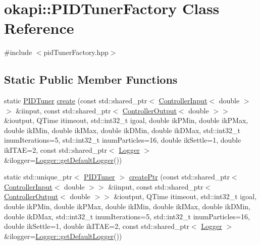 \hypertarget{classokapi_1_1PIDTunerFactory}{}\section{okapi\+::P\+I\+D\+Tuner\+Factory Class Reference}
\label{classokapi_1_1PIDTunerFactory}


{\ttfamily \#include $<$pid\+Tuner\+Factory.\+hpp$>$}

\subsection*{Static Public Member Functions}
\begin{DoxyCompactItemize}
\item 
static \mbox{\hyperlink{classokapi_1_1PIDTuner}{P\+I\+D\+Tuner}} \mbox{\hyperlink{classokapi_1_1PIDTunerFactory_afe5edc3050334e81b98a956c4a9392fe}{create}} (const std\+::shared\+\_\+ptr$<$ \mbox{\hyperlink{classokapi_1_1ControllerInput}{Controller\+Input}}$<$ double $>$$>$ \&iinput, const std\+::shared\+\_\+ptr$<$ \mbox{\hyperlink{classokapi_1_1ControllerOutput}{Controller\+Output}}$<$ double $>$$>$ \&ioutput, Q\+Time itimeout, std\+::int32\+\_\+t igoal, double ik\+P\+Min, double ik\+P\+Max, double ik\+I\+Min, double ik\+I\+Max, double ik\+D\+Min, double ik\+D\+Max, std\+::int32\+\_\+t inum\+Iterations=5, std\+::int32\+\_\+t inum\+Particles=16, double ik\+Settle=1, double ik\+I\+T\+AE=2, const std\+::shared\+\_\+ptr$<$ \mbox{\hyperlink{classokapi_1_1Logger}{Logger}} $>$ \&ilogger=\mbox{\hyperlink{classokapi_1_1Logger_a5053cf778b4b55acba788a3797dc96d2}{Logger\+::get\+Default\+Logger}}())
\item 
static std\+::unique\+\_\+ptr$<$ \mbox{\hyperlink{classokapi_1_1PIDTuner}{P\+I\+D\+Tuner}} $>$ \mbox{\hyperlink{classokapi_1_1PIDTunerFactory_ac57e059e968377f93864ba28a793ea1d}{create\+Ptr}} (const std\+::shared\+\_\+ptr$<$ \mbox{\hyperlink{classokapi_1_1ControllerInput}{Controller\+Input}}$<$ double $>$$>$ \&iinput, const std\+::shared\+\_\+ptr$<$ \mbox{\hyperlink{classokapi_1_1ControllerOutput}{Controller\+Output}}$<$ double $>$$>$ \&ioutput, Q\+Time itimeout, std\+::int32\+\_\+t igoal, double ik\+P\+Min, double ik\+P\+Max, double ik\+I\+Min, double ik\+I\+Max, double ik\+D\+Min, double ik\+D\+Max, std\+::int32\+\_\+t inum\+Iterations=5, std\+::int32\+\_\+t inum\+Particles=16, double ik\+Settle=1, double ik\+I\+T\+AE=2, const std\+::shared\+\_\+ptr$<$ \mbox{\hyperlink{classokapi_1_1Logger}{Logger}} $>$ \&ilogger=\mbox{\hyperlink{classokapi_1_1Logger_a5053cf778b4b55acba788a3797dc96d2}{Logger\+::get\+Default\+Logger}}())
\end{DoxyCompactItemize}


